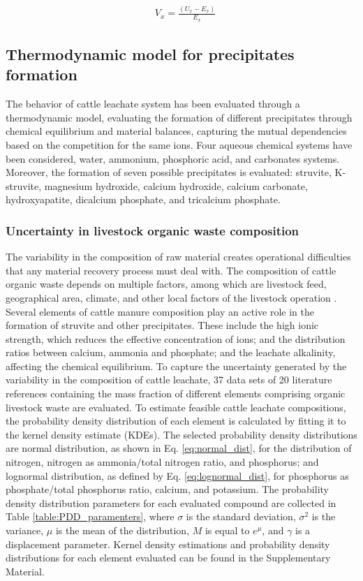 \begin{refsection}[referencesCh3]
\begin{align}
& V_{x} =\frac{\left(U_{x} - E_{x}\right)}{E_{x}} \label{eq:TES}
\end{align}

\subsection{Thermodynamic model for precipitates formation} \label{thermo_model}
The behavior of cattle leachate system has been evaluated through a thermodynamic model, evaluating the formation of different precipitates through chemical equilibrium and material balances, capturing the mutual dependencies based on the competition for the same ions. Four aqueous chemical systems have been considered, water, ammonium, phosphoric acid, and carbonates systems. Moreover, the formation of seven possible precipitates is evaluated: struvite, K-struvite, magnesium hydroxide, calcium hydroxide, calcium carbonate, hydroxyapatite, dicalcium phosphate, and tricalcium phosphate.

\subsubsection{Uncertainty in livestock organic waste composition} \label{comp_dist}
The variability in the composition of raw material creates operational difficulties that any material recovery process must deal with. The composition of cattle organic waste depends on multiple factors, among which are livestock feed, geographical area, climate, and other local factors of the livestock operation \citep{Tao}. Several elements of cattle manure composition play an active role in the formation of struvite and other precipitates. These include the high ionic strength, which reduces the effective concentration of ions; and the distribution ratios between calcium, ammonia and phosphate; and the leachate alkalinity, affecting the chemical equilibrium. To capture the uncertainty generated by the variability in the composition of cattle leachate, 37 data sets of 20 literature references containing the mass fraction of different elements comprising organic livestock waste are evaluated. To estimate feasible cattle leachate compositions, the probability density distribution of each element is calculated by fitting it to the kernel density estimate (KDEs). The selected probability density distributions are normal distribution, as shown in Eq. \ref{eq:normal_dist}, for the distribution of nitrogen, nitrogen as ammonia/total nitrogen ratio, and phosphorus; and lognormal distribution, as defined by  Eq. \ref{eq:lognormal_dist}, for phosphorus as phosphate/total phosphorus ratio, calcium, and potassium. The probability density distribution parameters for each evaluated compound are collected in Table \ref{table:PDD_paramenters}, where $\sigma$ is the standard deviation, $\sigma^2$ is the variance, $\mu$ is the mean of the distribution, $M$ is equal to $e^{\mu}$, and $\gamma$ is a displacement parameter. Kernel density estimations and probability density distributions for each element evaluated can be found in the Supplementary Material. 


\end{refsection}
